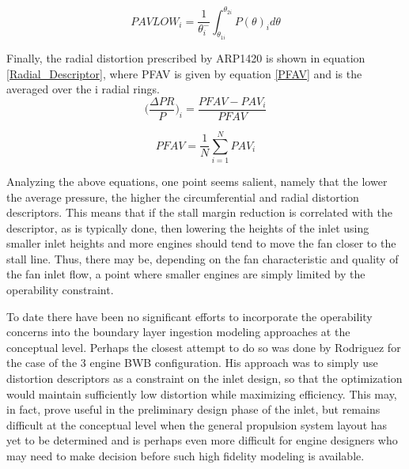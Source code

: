 \documentclass[12pt]{gatech-thesis}
\begin{document}
\begin{equation}PAVLOW_i = \frac{1}
                                                 {\theta_i^-}\int_{\theta_{1i}}^{\theta_{2i}}{P(\theta)_i d\theta}
\label{PaverageLow}\end{equation}%

Finally, the radial distortion prescribed by ARP1420 is shown in equation \ref{Radial_Descriptor}, where PFAV is given by equation \ref{PFAV} and is the averaged over the i radial rings.
\begin{equation}
	\Big(\frac{\Delta PR}
		    {P}\Big)_i = \frac{PFAV-PAV_i}
					{PFAV}
\label{Radial_Descriptor}\end{equation}%

\begin{equation}
	PFAV = \frac{1}
		         {N} \sum\limits_{i=1}^{N} PAV_i
\label{PFAV}\end{equation}%

Analyzing the above equations, one point seems salient, namely that the lower the average pressure, the higher the circumferential and radial distortion descriptors.  This means that if the stall margin reduction is correlated with the descriptor, as is typically done, then lowering the heights of the inlet using smaller inlet heights and more engines should tend to move the fan closer to the stall line.  Thus, there may be, depending on the fan characteristic and quality of the fan inlet flow, a point where smaller engines are simply limited by the operability constraint. 

\indent To date there have been no significant efforts to incorporate the operability concerns into the boundary layer ingestion modeling approaches at the conceptual level.  Perhaps the closest attempt to do so was done by Rodriguez for the case of the 3 engine BWB configuration.  His approach was to simply use distortion descriptors as a constraint on the inlet design, so that the optimization would maintain sufficiently low distortion while maximizing efficiency.  This may, in fact, prove useful in the preliminary design phase of the inlet, but remains difficult at the conceptual level when the general propulsion system layout has yet to be determined and is perhaps even more difficult for engine designers who may need to make decision before such high fidelity modeling is available.
\vspace{25pt}

\end{document}
